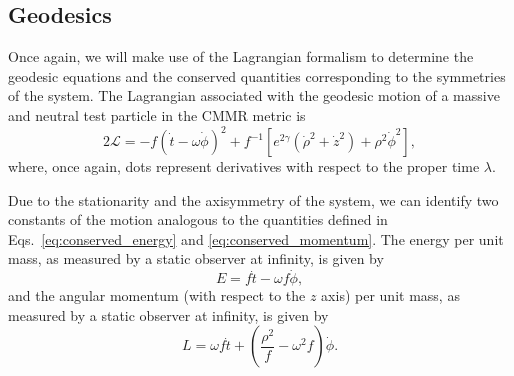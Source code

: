 \subsection{Geodesics}

Once again, we will make use of the Lagrangian formalism to determine the geodesic equations and the conserved quantities corresponding to the symmetries of the system. The Lagrangian associated with the geodesic motion of a massive and neutral test particle in the CMMR metric is~\cite{Dubeibe2016}
%
\begin{equation}
  2\mathcal{L} = -f(\dot{t} - \omega\dot{\phi})^2 +f^{-1}\left[e^{2\gamma}\left( \dot{\rho}^2 + \dot{z}^2 \right) + \rho^2\dot{\phi}^2 \right],
  \label{eq:cmmr_lagrangian}
\end{equation}
where, once again, dots represent derivatives with respect to the proper time $\lambda$.

%
Due to the stationarity and the axisymmetry of the system, we can identify two constants of the motion analogous to the quantities defined in Eqs.~\eqref{eq:conserved_energy}  and \eqref{eq:conserved_momentum}. The energy per unit mass, as measured by a static observer at infinity, is given by
%
\begin{equation}
  E = f\dot{t} - \omega f\dot{\phi},
  \label{eq:cmmr_energy_t_phi}
\end{equation}
%
and the angular momentum (with respect to the $z$ axis) per unit mass, as measured by a static observer at infinity, is given by
%
\begin{equation}
  L = \omega f \dot{t} + \left( \frac{\rho^2}{f} - \omega^2 f \right)\dot{\phi}.
  \label{eq:cmmr_ang_mom_t_phi}
\end{equation}
%

